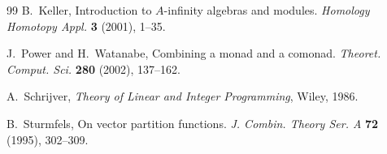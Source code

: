 \documentclass[11pt]{article}
\theoremstyle{definition}
\theoremstyle{remark}
\begin{document}
\begin{thebibliography}{99}
B.~Keller, Introduction to $A$-infinity algebras and modules. \emph{Homology Homotopy Appl.} \textbf{3} (2001), 1--35.

J.~Power and H.~Watanabe, Combining a monad and a comonad. \emph{Theoret. Comput. Sci.} \textbf{280} (2002), 137--162.

A.~Schrijver, \emph{Theory of Linear and Integer Programming}, Wiley, 1986.

B.~Sturmfels, On vector partition functions. \emph{J. Combin. Theory Ser. A} \textbf{72} (1995), 302--309.

\end{thebibliography}
\end{document}
